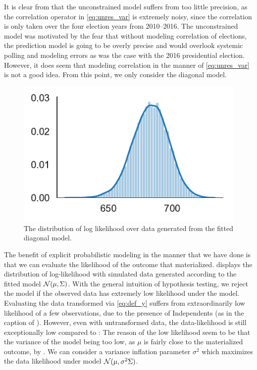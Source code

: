 \documentclass[12pt, letterpaper]{article}
\begin{document}
It is clear from  that the unconstrained model suffers from too little precision, as the correlation operator in \eqref{eq:unres_var} is extremely noisy, since the correlation is only taken over the four election years from 2010--2016. The unconstrained model was motivated by the fear that without modeling correlation of elections, the prediction model is going to be overly precise and would overlook systemic polling and modeling errors as was the case with the 2016 presidential election. However, it does seem that modeling correlation in the manner of \eqref{eq:unres_var} is not a good idea. From this point, we only consider the diagonal model. 

\begin{figure}[tbh]
  \centering
  \includegraphics{likelihood_dist.pdf}
  \caption{The distribution of log likelihood over data generated from the fitted diagonal model.}
  \label{fig:likelihood}
\end{figure}

The benefit of explicit probabilistic modeling in the manner that we have done
is that we can evaluate the likelihood of the outcome that materialized. 
 displays the distribution of log-likelihood with simulated data generated according to the fitted model $\mathcal{N}(\mu,\Sigma)$. With the general intuition of hypothesis testing, we reject the model if the observed data has extremely low likelihood under the model. Evaluating the data transformed via \eqref{eq:def_y} suffers from extraordinarily low likelihood of a few observations, due to the presence of Independents (as in the caption of ). However, even with untransformed data, the data-likelihood is still exceptionally low compared to :
 The reason of the low likelihood seem to be that the variance of the model being too low, as $\mu$ is fairly close to the materialized outcome, by . We can consider a variance inflation parameter $\sigma^2$ which maximizes the data likelihood under model $\mathcal{N}(\mu, \sigma^2 \Sigma)$. 
\end{document}

